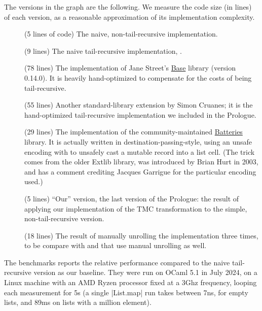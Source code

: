 The  versions in the graph are the following. We measure the code size (in lines) of each version, as a reasonable approximation of its implementation complexity.
\begin{description}
\item[] (5 lines of code) The naive, non-tail-recursive implementation.
\item[] (9 lines) The naive tail-recursive implementation,
  .
\item[] (78 lines) The implementation of Jane Street's
  \href{https://github.com/janestreet/base}{Base} library
  (version 0.14.0). It is heavily hand-optimized to compensate for the costs
  of being tail-recursive.
\item[] (55 lines) Another standard-library extension by Simon
  Cruanes; it is the hand-optimized tail-recursive implementation we
  included in the Prologue.
\item[] (29 lines) The implementation of the community-maintained
  \href{https://github.com/ocaml-batteries-team/batteries-included/}{Batteries}
  library. It is actually written in destination-passing-style, using
  an unsafe encoding with  to unsafely cast a mutable
  record into a list cell. (The trick comes from the older Extlib
  library, was introduced by Brian Hurt in 2003, and has a comment crediting Jacques
  Garrigue for the particular encoding used.)
\item[] (5 lines) ``Our'' version, the last version of the Prologue: the
  result of applying our implementation of the TMC transformation to
  the simple, non-tail-recursive version.
\item[] (18 lines) The result of manually unrolling the  implementation three times, to be compare with  and  that use manual unrolling as well.
\end{description}

The benchmarks reports the relative performance compared to the naive tail-recursive version as our baseline. They were run on OCaml 5.1 in July 2024, on a Linux machine with an AMD Ryzen processor fixed at a 3Ghz frequency, looping each measurement for 5s (a single \ocaml|List.map| run takes between 7ns, for empty lists, and 89ms on lists with a million element).

